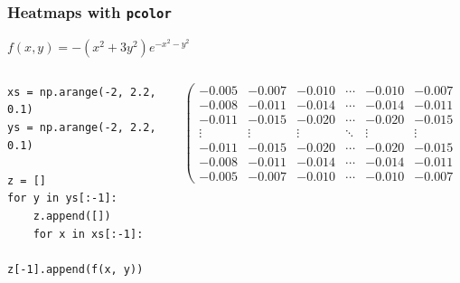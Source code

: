 \documentclass{beamer}
\begin{document}
\begin{frame}[fragile]
\frametitle{Heatmaps with \texttt{pcolor}}
\vfill
\begin{center}
$f(x, y) = -\left(x^2+3y^2\right)e^{-x^2-y^2}$
\end{center}
\vfill
\tiny{
\begin{columns}
\begin{column}{0.35\textwidth}
\begin{verbatim}
xs = np.arange(-2, 2.2, 0.1)
ys = np.arange(-2, 2.2, 0.1)

z = []
for y in ys[:-1]:
    z.append([])
    for x in xs[:-1]:
        z[-1].append(f(x, y))
\end{verbatim}
\end{column}
\begin{column}{0.65\textwidth}
\begin{equation*}
\begin{pmatrix}
-0.005 & -0.007 & -0.010 & \cdots & -0.010 & -0.007 & -0.005 \\
-0.008 & -0.011 & -0.014 & \cdots & -0.014 & -0.011 & -0.008 \\
-0.011 & -0.015 & -0.020 & \cdots & -0.020 & -0.015 & -0.011 \\
\vdots & \vdots & \vdots & \ddots & \vdots & \vdots & \vdots \\
-0.011 & -0.015 & -0.020 & \cdots & -0.020 & -0.015 & -0.011 \\
-0.008 & -0.011 & -0.014 & \cdots & -0.014 & -0.011 & -0.008 \\
-0.005 & -0.007 & -0.010 & \cdots & -0.010 & -0.007 & -0.005
\end{pmatrix}
\end{equation*}
\end{column}
\end{columns}
}
\vfill
\end{frame}
\end{document}
